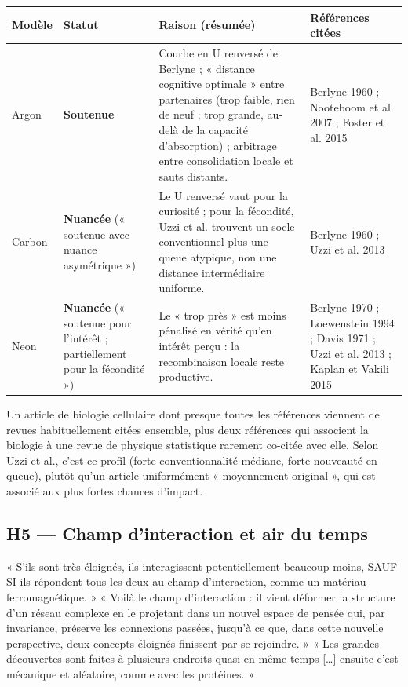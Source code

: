 \documentclass[a4paper,11pt]{article}
\makeatletter
\newenvironment{avis}{\small\renewcommand{\arraystretch}{1.15}%
\begin{longtable}{@{}>{\raggedright\arraybackslash}p{1.35cm}>{\raggedright\arraybackslash}p{2.45cm}>{\raggedright\arraybackslash}p{7.15cm}>{\raggedright\arraybackslash}p{4.4cm}@{}}
\toprule \textbf{Modèle} & \textbf{Statut} & \textbf{Raison (résumée)} & \textbf{Références citées}\\ \midrule \endhead
\bottomrule \endfoot}{\end{longtable}}
\newcommand{\st}[1]{\textbf{#1}}
\makeatother
\begin{document}
\begin{avis}
Argon & \st{Soutenue} & Courbe en U renversé de Berlyne ; « distance cognitive optimale » entre partenaires (trop faible, rien de neuf ; trop grande, au-delà de la capacité d'absorption) ; arbitrage entre consolidation locale et sauts distants. & Berlyne 1960 ; Nooteboom et al. 2007 ; Foster et al. 2015\\ \midrule
Carbon & \st{Nuancée} (« soutenue avec nuance asymétrique ») & Le U renversé vaut pour la curiosité ; pour la fécondité, Uzzi et al. trouvent un socle conventionnel plus une queue atypique, non une distance intermédiaire uniforme. & Berlyne 1960 ; Uzzi et al. 2013\\ \midrule
Neon & \st{Nuancée} (« soutenue pour l'intérêt ; partiellement pour la fécondité ») & Le « trop près » est moins pénalisé en vérité qu'en intérêt perçu : la recombinaison locale reste productive. & Berlyne 1970 ; Loewenstein 1994 ; Davis 1971 ; Uzzi et al. 2013 ; Kaplan et Vakili 2015\\
\end{avis}

\begin{exemple}
Un article de biologie cellulaire dont presque toutes les références viennent de revues habituellement citées ensemble, plus deux références qui associent la biologie à une revue de physique statistique rarement co-citée avec elle. Selon Uzzi et al., c'est ce profil (forte conventionnalité médiane, forte nouveauté en queue), plutôt qu'un article uniformément « moyennement original », qui est associé aux plus fortes chances d'impact.
\end{exemple}

\subsection{H5 — Champ d'interaction et air du temps}
\begin{enonce}
« S'ils sont très éloignés, ils interagissent potentiellement beaucoup moins, SAUF SI ils répondent tous les deux au champ d'interaction, comme un matériau ferromagnétique. » « Voilà le champ d'interaction : il vient déformer la structure d'un réseau complexe en le projetant dans un nouvel espace de pensée qui, par invariance, préserve les connexions passées, jusqu'à ce que, dans cette nouvelle perspective, deux concepts éloignés finissent par se rejoindre. » « Les grandes découvertes sont faites à plusieurs endroits quasi en même temps […] ensuite c'est mécanique et aléatoire, comme avec les protéines. »
\end{enonce}
\end{document}

